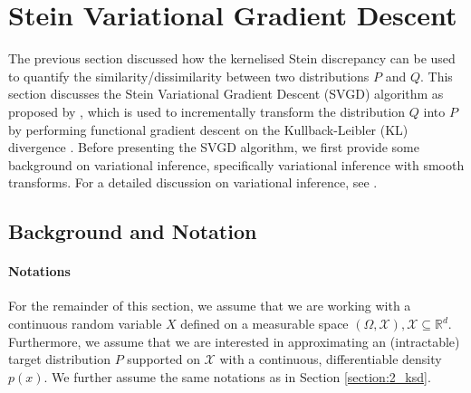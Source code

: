 




\section{Stein Variational Gradient Descent}
\label{section:2_svgd}

The previous section discussed how the kernelised Stein discrepancy can be used to quantify the similarity/dissimilarity between two distributions $P$ and $Q$. This section discusses the Stein Variational Gradient Descent (SVGD) algorithm as proposed by \citet{liu_svgd}, which is used to incrementally transform the distribution $Q$ into $P$ by performing functional gradient descent on the Kullback-Leibler (KL) divergence \citep{liu_svgd, han_gf_svgd}. 
Before presenting the SVGD algorithm, we first provide some background on variational inference, specifically variational inference with smooth transforms. For a detailed discussion on variational inference, see \citet{blei_vi_review}.

\subsection{Background and Notation}

\paragraph*{Notations}

For the remainder of this section, we assume that we are working with a continuous random variable $X$ defined on a measurable space $(\Omega, \mathcal{X}), \mathcal{X} \subseteq \mathbb{R}^d$. Furthermore, we assume that we are interested in approximating an (intractable) target distribution $P$ supported on $\mathcal{X}$ with a continuous, differentiable density $p(x)$. We further assume the same notations as in Section \ref{section:2_ksd}.

